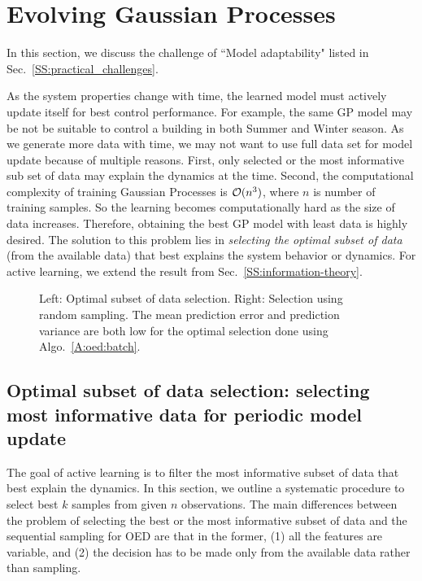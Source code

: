 \section{Evolving Gaussian Processes}
\label{S:active}

In this section, we discuss the challenge of ``Model adaptability" listed in Sec.~\ref{SS:practical_challenges}.

As the system properties change with time, the learned model must actively update itself for best control performance.
For example, the same GP model may be not be suitable to control a building in both Summer and Winter season.
As we generate more data with time, we may not want to use full data set for model update because of multiple reasons.
First, only selected or the most informative sub set of data may explain the dynamics at the time. Second, the computational complexity of training Gaussian Processes is $\mathcal{O}(n^3)$, where $n$ is number of training samples. So the learning becomes computationally hard as the size of data increases.
Therefore, obtaining the best GP model with least data is highly desired. The solution to this problem lies in \textit{selecting the optimal subset of data} (from the available data) that best explains the system behavior or dynamics.
For active learning, we extend the result from Sec.~\ref{SS:information-theory}.

\begin{figure*}[t]
	\centering
	\setlength{}
	\setlength{}
	
	
	\caption{Left: Optimal subset of data selection. Right: Selection using random sampling. The mean prediction error and prediction variance are both low for the optimal selection done using Algo.~\ref{A:oed:batch}.}
	\captionsetup{justification=centering}
	\label{F:active:example}
\end{figure*}

\subsection{Optimal subset of data selection: selecting most informative data for periodic model update}

The goal of active learning is to filter the most informative subset of data that best explain the dynamics.
In this section, we outline a systematic procedure to select best $k$ samples from given $n$ observations.
The main differences between the problem of selecting the best or the most informative subset of data and the sequential sampling for OED are that in the former, (1) all the features are variable, and (2) the decision has to be made only from the available data rather than sampling. 

